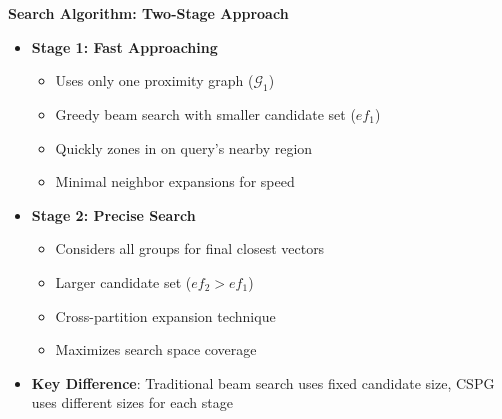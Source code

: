 \begin{frame}
\begin{center}
\LARGE\textbf{Search Algorithm: Two-Stage Approach}
\end{center}

\vspace{5mm}

\begin{itemize}
    \item \textbf{Stage 1: Fast Approaching}
    \begin{itemize}
        \item Uses only one proximity graph ($\mathcal{G}_1$)
        \item Greedy beam search with smaller candidate set ($ef_1$)
        \item Quickly zones in on query's nearby region
        \item Minimal neighbor expansions for speed
    \end{itemize}
    
    \item \textbf{Stage 2: Precise Search}
    \begin{itemize}
        \item Considers all groups for final closest vectors
        \item Larger candidate set ($ef_2 > ef_1$)
        \item Cross-partition expansion technique
        \item Maximizes search space coverage
    \end{itemize}
    
    \item \textbf{Key Difference}: Traditional beam search uses fixed candidate size, CSPG uses different sizes for each stage
\end{itemize}
\end{frame}%
